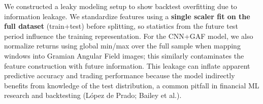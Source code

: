 We constructed a leaky modeling setup to show backtest overfitting due to information leakage.
We standardize features using a \textbf{single scaler fit on the full dataset} (train+test) before splitting, so statistics from the future test period influence the training representation.
For the CNN+GAF model, we also normalize returns using global min/max over the full sample when mapping windows into Gramian Angular Field images; this similarly contaminates the feature construction with future information.
This leakage can inflate apparent predictive accuracy and trading performance because the model indirectly benefits from knowledge of the test distribution, a common pitfall in financial ML research and backtesting (L\'opez de Prado; Bailey et al.).
